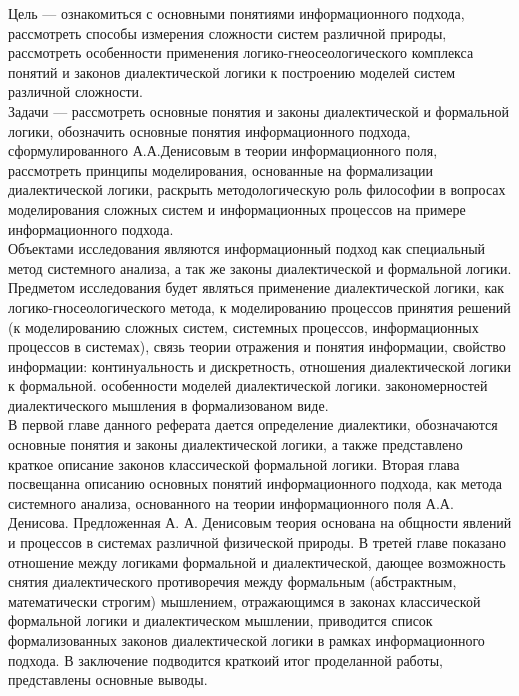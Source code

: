 \documentclass[a4paper,12pt]{report}
\begin{document}
	Цель — ознакомиться с основными понятиями информационного подхода, рассмотреть способы измерения сложности систем различной природы, рассмотреть особенности применения логико-гнеосеологического комплекса понятий и законов диалектической логики к построению моделей систем различной сложности.\\
	
	Задачи —  рассмотреть основные понятия и законы диалектической и формальной логики,  обозначить основные понятия информационного подхода, сформулированного А.А.Денисовым в теории информационного поля, рассмотреть принципы моделирования, основанные на формализации диалектической логики, раскрыть методологическую роль философии в  вопросах моделирования сложных систем и информационных процессов на примере информационного подхода. \\
	
	Объектами исследования являются информационный подход как специальный метод системного анализа, а так же законы диалектической и формальной логики.\\
	
	Предметом исследования будет являться применение диалектической логики, как логико-гносеологического метода, к моделированию процессов принятия решений (к моделированию сложных систем, системных процессов, информационных процессов в системах), связь теории отражения и понятия информации, свойство информации: континуальность и дискретность,  отношения диалектической логики к формальной. особенности моделей диалектической логики.  закономерностей диалектического мышления в формализованом виде.\\
	
	В первой главе данного реферата дается  определение диалектики, обозначаются основные понятия и законы диалектической логики, а также представлено краткое описание законов классической формальной логики.  Вторая глава посвещанна описанию основных понятий информационного подхода, как метода системного анализа, основанного на теории информационного поля А.А. Денисова. Предложенная А. А. Денисовым теория основана на общности явлений и процессов в системах различной физической природы. В третей главе показано отношение между логиками формальной и диалектической, дающее возможность снятия диалектического  противоречия между формальным (абстрактным, математически строгим) мышлением, отражающимся в законах классической формальной логики и диалектическом мышлении, приводится список формализованных законов диалектической логики в рамках информационного подхода. В заключение подводится краткоий итог проделанной работы, представлены основные выводы.  
\\
\end{document}
